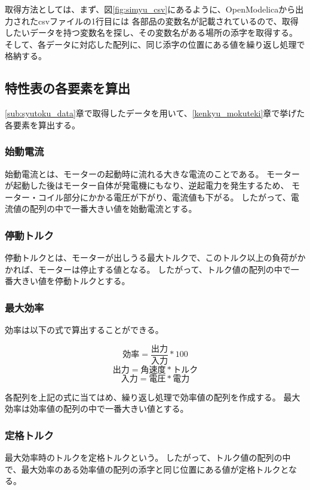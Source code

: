 取得方法としては、まず、図\ref{fig:simyu_csv}にあるように、OpenModelicaから出力されたcsvファイルの1行目には
各部品の変数名が記載されているので、取得したいデータを持つ変数名を探し、その変数名がある場所の添字を取得する。
そして、各データに対応した配列に、同じ添字の位置にある値を繰り返し処理で格納する。

\subsection{特性表の各要素を算出}\label{sub:keisan}
\ref{sub:syutoku_data}章で取得したデータを用いて、\ref{kenkyu_mokuteki}章で挙げた各要素を算出する。

\subsubsection{始動電流}\label{sub:sub:sidouden}
始動電流とは、モーターの起動時に流れる大きな電流のことである。
モーターが起動した後はモーター自体が発電機にもなり、逆起電力を発生するため、
モーター・コイル部分にかかる電圧が下がり、電流値も下がる。
したがって、電流値の配列の中で一番大きい値を始動電流とする。

\subsubsection{停動トルク}\label{sub:sub:teidoutoruku}
停動トルクとは、モーターが出しうる最大トルクで、このトルク以上の負荷がかかれば、モーターは停止する値となる。
したがって、トルク値の配列の中で一番大きい値を停動トルクとする。

\subsubsection{最大効率}\label{sub:sub:saidaikouritu}
効率は以下の式で算出することができる。

\[
    \mbox{効率} = \frac{\mbox{出力}}{\mbox{入力}}  * 100 
\]
\[
    \mbox{出力} = \mbox{角速度} * \mbox{トルク} 
\]
\[  
    \mbox{入力} = \mbox{電圧} * \mbox{電力} 
\]

各配列を上記の式に当てはめ、繰り返し処理で効率値の配列を作成する。
最大効率は効率値の配列の中で一番大きい値とする。


\subsubsection{定格トルク}\label{sub:sub:teikakutoruku}
最大効率時のトルクを定格トルクという。
したがって、トルク値の配列の中で、最大効率のある効率値の配列の添字と同じ位置にある値が定格トルクとなる。


